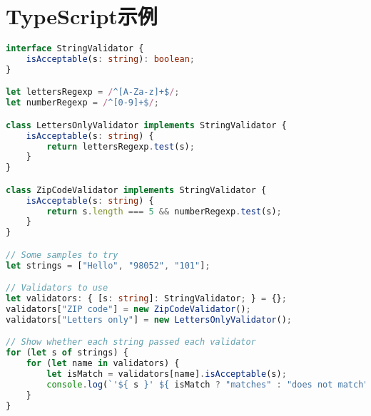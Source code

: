 \documentclass[oneside, UTF8, fontset=adobe]{ctexart}%
\begin{document}
\section{TypeScript示例}
\begin{lstlisting}[language=TypeScript]
interface StringValidator {
    isAcceptable(s: string): boolean;
}

let lettersRegexp = /^[A-Za-z]+$/;
let numberRegexp = /^[0-9]+$/;

class LettersOnlyValidator implements StringValidator {
    isAcceptable(s: string) {
        return lettersRegexp.test(s);
    }
}

class ZipCodeValidator implements StringValidator {
    isAcceptable(s: string) {
        return s.length === 5 && numberRegexp.test(s);
    }
}

// Some samples to try
let strings = ["Hello", "98052", "101"];

// Validators to use
let validators: { [s: string]: StringValidator; } = {};
validators["ZIP code"] = new ZipCodeValidator();
validators["Letters only"] = new LettersOnlyValidator();

// Show whether each string passed each validator
for (let s of strings) {
    for (let name in validators) {
        let isMatch = validators[name].isAcceptable(s);
        console.log(`'${ s }' ${ isMatch ? "matches" : "does not match" } '${ name }'.`);
    }
}
\end{lstlisting}
\end{document}
